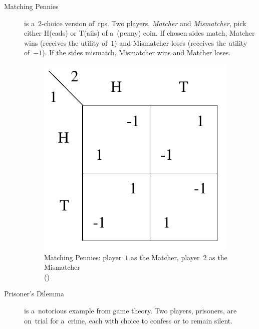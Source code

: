 \begin{description}
  \item [Matching Pennies] is a~$2$-choice version of~\acrshort{rps}.
    Two players, \emph{Matcher} and \emph{Mismatcher}, pick either H(eads) or T(ails) of a~(penny) coin.
    If chosen sides match, Matcher wins (receives the utility of~$1$) and Mismatcher loses (receives the utility of~$-1$).
    If the sides mismatch, Mismatcher wins and Matcher loses.
    \begin{figure}[H]
      \centering
      \includegraphics[width=.3\textwidth]{../img/matching-pennies.png}
      \caption[Matching Pennies]{Matching Pennies: player~$1$ as the Matcher, player~$2$ as the Mismatcher \\(\cite{AGT07})}
      \label{fig:matching-pennies}
    \end{figure}

  \item [Prisoner's Dilemma] is a~notorious example from game theory.
    Two players, prisoners, are on~trial for a~crime, each with choice to confess or to remain silent.


\end{description}

